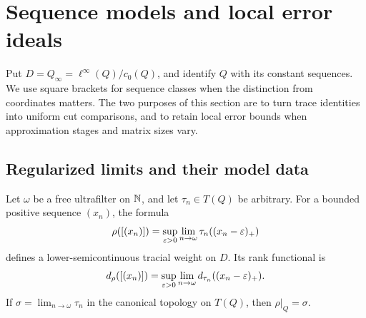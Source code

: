 \section{Sequence models and local error ideals}\label{sec:sequence-models}

Put \(D=Q_\infty=\ell^\infty(Q)/c_0(Q)\), and identify \(Q\)
with its constant sequences. We use square brackets for sequence
classes when the distinction from coordinates matters. The two
purposes of this section are to turn trace identities into uniform
cut comparisons, and to retain local error bounds when approximation
stages and matrix sizes vary.

\subsection{Regularized limits and their model data}

\begin{proposition}\label{seq:regularized}
Let \(\omega\) be a free ultrafilter on \(\mathbb N\), and let
\(\tau_n\in T(Q)\) be arbitrary. For a bounded positive sequence
\((x_n)\), the formula
\begin{equation}\label{seq:regularization-formula}
 \rho([(x_n)])=
 \sup_{\varepsilon>0}\lim_{n\to\omega}\tau_n((x_n-\varepsilon)_+)
\end{equation}
defines a lower-semicontinuous tracial weight on \(D\).
Its rank functional is
\begin{equation}\label{seq:regularized-rank}
 d_\rho([(x_n)])=
 \sup_{\varepsilon>0}\lim_{n\to\omega}d_{\tau_n}((x_n-\varepsilon)_+).
\end{equation}
If \(\sigma=\lim_{n\to\omega}\tau_n\) in the canonical topology
on \(T(Q)\), then \(\rho|_Q=\sigma\).
\end{proposition}

